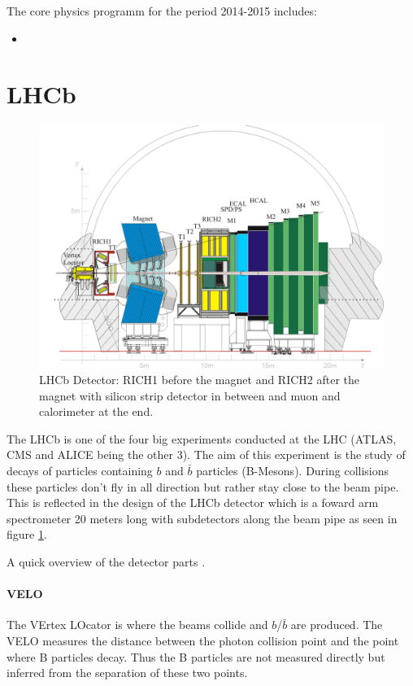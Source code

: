 \documentclass[10pt,twoside]{scrreprt}
\begin{document}
The core physics programm for the period 2014-2015 includes:

\begin{itemize}
  \item <COMMENT: PROGRAM>
\end{itemize}




\section{LHCb}

\begin{figure}[tb]
  \centering
  \includegraphics[width=\textwidth]{pics/lhcb_detector}
  \caption{LHCb Detector: RICH1 before the magnet and RICH2 after the magnet with silicon strip detector in between and muon and calorimeter at the end.}
  \label{fig:lhcb}
\end{figure}

The LHCb is one of the four big experiments conducted at the LHC (ATLAS, CMS and ALICE being the other 3). The aim of this experiment is the study of decays of particles containing $b$ and $\bar{b}$ particles (B-Mesons). During collisions these particles don't fly in all direction but rather stay close to the beam pipe. This is reflected in the design of the LHCb detector which is a foward arm spectrometer 20 meters long with subdetectors along the beam pipe as seen in figure \ref{fig:lhcb}.

A quick overview of the detector parts \parencite{lhcbweb}.

\paragraph{VELO} The VErtex LOcator is where the beams collide and $b$/$\bar{b}$ are produced. The VELO measures the distance between the photon collision point and the point where B particles decay. Thus the B particles are not measured directly but inferred from the separation of these two points.
\end{document}
